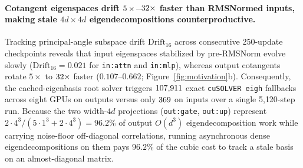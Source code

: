 \paragraph{Cotangent eigenspaces drift $5\times$--$32\times$ faster than RMSNormed inputs, making stale $4d\times 4d$ eigendecompositions counterproductive.}
Tracking principal-angle subspace drift $\mathrm{Drift}_{16}$ across consecutive
250-update checkpoints reveals that input eigenspaces stabilized by pre-RMSNorm
evolve slowly ($\mathrm{Drift}_{16} = 0.021$ for \texttt{in:attn} and
\texttt{in:mlp}), whereas output cotangents rotate $5\times$ to
$32\times$ faster ($0.107$--$0.662$;
Figure~\ref{fig:motivation}b). Consequently, the cached-eigenbasis root solver
triggers $107{,}911{}$ exact \texttt{cuSOLVER eigh} fallbacks across eight
GPUs on outputs versus only $369{}$ on inputs over a single 5{,}120-step
run. Because the two width-$4d$ projections (\texttt{out:gate}, \texttt{out:up})
represent $2\cdot 4^3 / (5\cdot 1^3 + 2\cdot 4^3) = 96.2\%$ of output $O(d^3)$
eigendecomposition work while carrying noise-floor off-diagonal correlations,
running asynchronous dense eigendecompositions on them pays $96.2\%$ of the
cubic cost to track a stale basis on an almost-diagonal matrix.

\begin{table}[t]
\centering
\caption{Empirical covariance structure, diagonal root fidelity, and subspace
drift across all 11 layer-moment groups of baseline  (32-layer
medians at update $2{,}500$ / $1.31\text{B}$ tokens; 352 FP32 EMA moments).
Columns report moment width $d$, normalized effective rank $\mathrm{erank}/d$,
diagonal coefficient of variation $\mathrm{CV}_{\diag}$, off-diagonal
correlation RMS $\rho_{\mathrm{rms}}$ (finite-sample floor $N_t^{-1/2} \approx
0.0052$), diagonal energy share $\mathrm{DiagE}$, diagonal share of centered
anisotropy $\mathrm{DiagAniso} = \|\Diag(\tilde A - I)\|_F^2 / \|\tilde A - I\|_F^2$,
Frobenius $R^2$ of the diagonal inverse square root relative to dense
$\tilde A^{-1/2}$, and top-16 principal-angle subspace drift $\mathrm{Drift}_{16}$
over $250$ updates ($2{,}250 \to 2{,}500$).}
\label{tab:motivation}
\footnotesize\setlength{\tabcolsep}{4.8pt}
\resizebox{\textwidth}{!}{}
\end{table}

